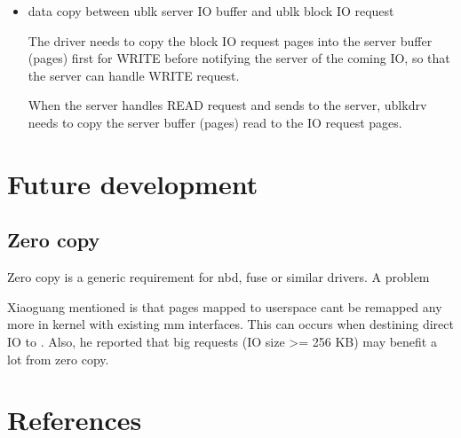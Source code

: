 \documentclass[a4paper,11pt,english]{sphinxmanual}
\begin{document}
\begin{itemize}
With  enabled, the WRITE request will be firstly
issued to ublk server without data copy. Then, IO backend of ublk server
receives the request and it can allocate data buffer and embed its addr
inside this new io command. After the kernel driver gets the command,
data copy is done from request pages to this backend\textquotesingle{}s buffer. Finally,
backend receives the request again with data to be written and it can
truly handle the request.

 adds one additional round\sphinxhyphen{}trip and one
io\_uring\_enter() syscall. Any user thinks that it may lower performance
should not enable UBLK\_F\_NEED\_GET\_DATA. ublk server pre\sphinxhyphen{}allocates IO
buffer for each IO by default. Any new project should try to use this
buffer to communicate with ublk driver. However, existing project may
break or not able to consume the new buffer interface; that\textquotesingle{}s why this
command is added for backwards compatibility so that existing projects
can still consume existing buffers.

\item {} 
data copy between ublk server IO buffer and ublk block IO request

The driver needs to copy the block IO request pages into the server buffer
(pages) first for WRITE before notifying the server of the coming IO, so
that the server can handle WRITE request.

When the server handles READ request and sends
 to the server, ublkdrv needs to copy
the server buffer (pages) read to the IO request pages.

\end{itemize}


\section{Future development}
\label{\detokenize{ublk:future-development}}

\subsection{Zero copy}
\label{\detokenize{ublk:zero-copy}}
Zero copy is a generic requirement for nbd, fuse or similar drivers. A
problem %
\begin{footnote}[6]\sphinxAtStartFootnote
{}
%
\end{footnote} Xiaoguang mentioned is that pages mapped to userspace
can\textquotesingle{}t be remapped any more in kernel with existing mm interfaces. This can
occurs when destining direct IO to . Also, he reported that
big requests (IO size \textgreater{}= 256 KB) may benefit a lot from zero copy.


\section{References}
\label{\detokenize{ublk:references}}


\renewcommand{\indexname}{Index}
\printindex
\end{document}
